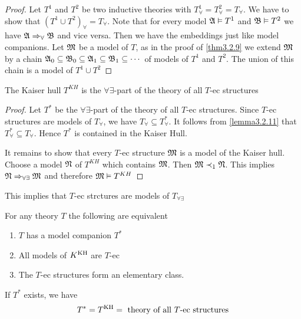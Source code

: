 \documentclass[11pt]{article}
\begin{document}
\begin{proof}
Let \(T^1\) and \(T^2\) be two inductive theories with
\(T_{\forall}^1=T_{\forall}^2=T_{\forall}\). We have to show
that \((T^1\cup T^2)_\forall=T_\forall\). Note that for every model \(\mathfrak{A}\vDash T^1\) and \(\mathfrak{B}\vDash T^2\) we have
\(\mathfrak{A}\Rightarrow_\forall\mathfrak{B}\) and vice versa. Then we have the embeddings just like model companions.
Let \(\mathfrak{M}\) be a model
of \(T\), as in the proof of \ref{thm3.2.9} we extend \(\mathfrak{M}\) by a chain
\(\mathfrak{A}_0\subseteq\mathfrak{B}_0\subseteq\mathfrak{A}_1\subseteq\mathfrak{B}_1\subseteq\cdots\) of models
of \(T^1\) and \(T^2\). The union of this chain is a model of \(T^1\cup T^2\)
\end{proof}

\begin{lemma}[]
\label{lemma3.2.13}
The Kaiser hull \(T^{KH}\) is the \(\forall\exists\)-part of the theory of
all \(T\)-ec structures
\end{lemma}

\begin{proof}
Let \(T^*\) be the \(\forall\exists\)-part of the theory of all \(T\)-ec
structures. Since \(T\)-ec structures are models of \(T_{\forall}\), we have
\(T_\forall\subseteq T^*_\forall\). It follows from \ref{lemma3.2.11} that
\(T_\forall^*\subseteq T_\forall\). Hence \(T^*\) is contained in the Kaiser Hull.

It remains to show that every \(T\)-ec structure \(\mathfrak{M}\) is a model of the Kaiser hull. Choose a
model \(\mathfrak{N}\) of \(T^{KH}\) which contains \(\mathfrak{M}\). Then \(\mathfrak{M}\prec_1\mathfrak{N}\). This implies \(\mathfrak{N}\Rightarrow_{\forall\exists}\mathfrak{M}\) and
therefore \(\mathfrak{M}\vDash T^{KH}\)
\end{proof}

This implies that \(T\)-ec strctures are models of \(T_{\forall\exists}\)

\begin{theorem}[]
For any theory \(T\) the following are equivalent
\begin{enumerate}
\item \(T\) has a model companion \(T^*\)
\item All models of \(K^{\operatorname{KH}}\) are \(T\)-ec
\item The \(T\)-ec structures form an elementary class.
\end{enumerate}


If \(T^*\) exists, we have
\begin{equation*}
T^*=T^{\operatorname{KH}}=\text{ theory of all $T$-ec structures}
\end{equation*}
\end{theorem}
\end{document}
